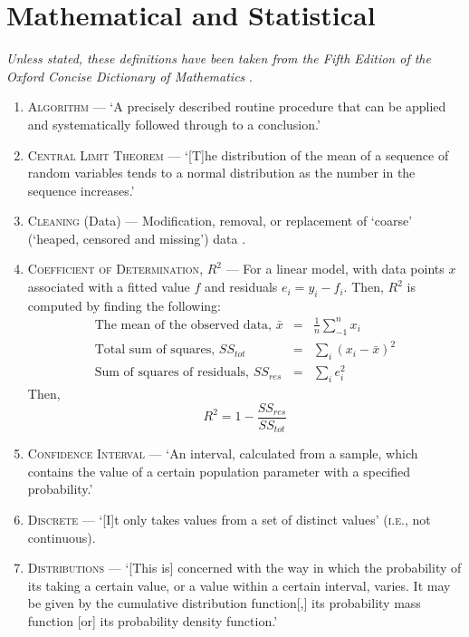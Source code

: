 \documentclass[a4paper,10pt]{report}
\begin{document}
\section{Mathematical and Statistical}\label{app:definitionsmaths}
\emph{Unless stated, these definitions have been taken from the Fifth Edition of the Oxford Concise Dictionary of Mathematics} \autocite{OxfordMathsDict}.
\renewcommand{\labelenumi}{(\roman{enumi})}
\begin{enumerate}
	\item \label{def:algorithm} \textsc{Algorithm} --- `A precisely described routine procedure that can be applied and systematically followed through to a conclusion.'
	
	\item \label{def:centrallimittheorem} \textsc{Central Limit Theorem} --- `[T]he distribution of the mean of a sequence of random variables tends to a normal distribution as the number in the sequence increases.'
	
	\item \label{def:cleaning} \textsc{Cleaning} (Data) --- Modification, removal, or replacement of `coarse' (`heaped, censored and missing') data \autocite{wu12}.
	
	\item \label{def:coeffofdet} \textsc{Coefficient of Determination}, $R^2$ --- For a linear model, with data points $x$ associated with a fitted value $f$ and residuals $e_i = y_i - f_i$. Then, $R^2$ is computed by finding the following:
	$$ \begin{array}{rcl}
	\textrm{The mean of the observed data, }\bar{x} &=& \frac{1}{n} \sum^{n}_{-1} x_i \\
	\textrm{Total sum of squares, }SS_{tot} &=& \sum_i (x_i - \bar{x})^2 \\
	\textrm{Sum of squares of residuals, }SS_{res} &=& \sum_i e_i^2
	\end{array}
	$$ 
	Then,
	$$R^2 = 1 - \frac{SS_{res}}{SS_{tot}} $$
	
	\item \label{def:confidenceinterval} \textsc{Confidence Interval} --- `An interval, calculated from a sample, which contains the value of a certain population parameter with a specified probability.'
	
	\item \label{def:discrete} \textsc{Discrete} --- `[I]t only takes values from a set of distinct values' (\textsc{i.e.}, not continuous).
	
	\item \label{def:distributions} \textsc{Distributions} --- `[This is] concerned with the way in which the probability of its taking a certain value, or a value within a certain interval, varies. It may be given by the cumulative distribution function[,] its probability mass function [or] its probability density function.'
	

\end{enumerate}
\end{document}
